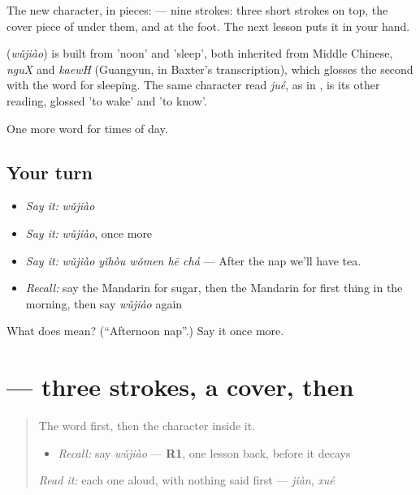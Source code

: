 The new character, in pieces:  — nine strokes: three short strokes on top, the cover piece of  under them, and  at the foot. The next lesson puts it in your hand.

\begin{cousinweb}
\textbf{} (\emph{wǔjiào}) is built from  'noon' and  'sleep', both inherited from Middle Chinese, \emph{nguX} and \emph{kaewH} (Guangyun, in Baxter's transcription), which glosses the second with the word for sleeping. The same character read \emph{jué}, as in , is its other reading, glossed 'to wake' and 'to know'.
\end{cousinweb}

\begin{grammarlens}[title={What you've built}]
One more word for times of day.
\end{grammarlens}

\subsection*{Your turn}
\begin{itemize}
\raggedright
  \item \emph{Say it:} \emph{wǔjiào}
  \item \emph{Say it:} \emph{wǔjiào}, once more
  \item \emph{Say it:} \emph{wǔjiào yǐhòu wǒmen hē chá} — After the nap we'll have tea.
  \item \emph{Recall:} say the Mandarin for sugar, then the Mandarin for first thing in the morning, then say \emph{wǔjiào} again
\end{itemize}

\begin{tcolorbox}[breakable,colback=teal!4,colframe=teal!35!black,title={Before you move on}]
What does  mean? (\textquotedblleft{}Afternoon nap\textquotedblright{}.) Say it once more.
\end{tcolorbox}
\section[\texorpdfstring{\zh{觉} (jiào)}{觉 (jiào)}]{ — three strokes, a cover, then }

\label{lesson:ZH-W169-jiao-sleep}



\begin{quote}
The word first, then the character inside it.

\begin{itemize}
\raggedright
  \item \emph{Recall:} say \emph{wǔjiào} — \textbf{R1}, one lesson back, before it decays
\end{itemize}

\begin{quote}
 
\end{quote}

\emph{Read it:} each one aloud, with nothing said first — \emph{jiàn}, \emph{xué}
\end{quote}

